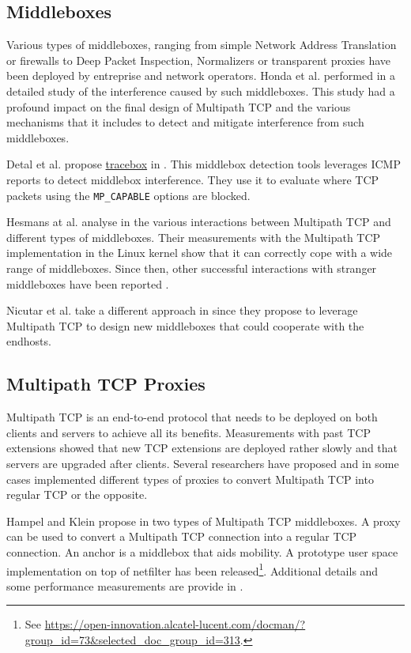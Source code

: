 \subsection{Middleboxes}

Various types of middleboxes, ranging from simple Network Address Translation or firewalls to Deep Packet Inspection, Normalizers or transparent proxies have been deployed by entreprise and network operators. Honda et al. performed in \cite{Honda_Extend:2011} a detailed study of the interference caused by such middleboxes. This study had a profound impact on the final design of Multipath TCP and the various mechanisms that it includes to detect and mitigate interference from such middleboxes.

Detal et al. propose \href{http://tracebox.org}{tracebox} in \cite{Detal_tracebox:2013}. This middlebox detection tools leverages ICMP reports to detect middlebox interference. They use it to evaluate where TCP packets using the \texttt{MP\_CAPABLE} options are blocked.

Hesmans at al. analyse in \cite{Hesmans_Extensions:2013} the various interactions between Multipath TCP and different types of middleboxes. Their measurements with the Multipath TCP implementation in the Linux kernel show that it can correctly cope with a wide range of middleboxes. Since then, other successful interactions with stranger middleboxes have been reported \cite{draft-ietf-mptcp-experience}.

Nicutar et al. take a different approach in \cite{Nicutar_Acrobatics:2013} since they propose to leverage Multipath TCP to design new middleboxes that could cooperate with the endhosts.

\subsection{Multipath TCP Proxies}

Multipath TCP is an end-to-end protocol that needs to be deployed on both clients and servers to achieve all its benefits.
Measurements with past TCP extensions showed that new TCP extensions are deployed rather slowly and that servers are
upgraded after clients. Several researchers have proposed
and in some cases implemented different types of proxies to convert Multipath TCP into regular TCP or the opposite.

Hampel and Klein propose in \cite{draft-hampel-mptcp-proxies-anchors} two types of Multipath TCP middleboxes. A proxy can be used to convert a Multipath TCP 
connection into a regular TCP connection. An anchor is a middlebox that aids mobility.  
A prototype user space implementation on top of netfilter has been released\footnote{See \url{https://open-innovation.alcatel-lucent.com/docman/?group_id=73&selected_doc_group_id=313}.}. Additional details and some performance measurements are provide in \cite{Hampel_Seamless:2013}.

